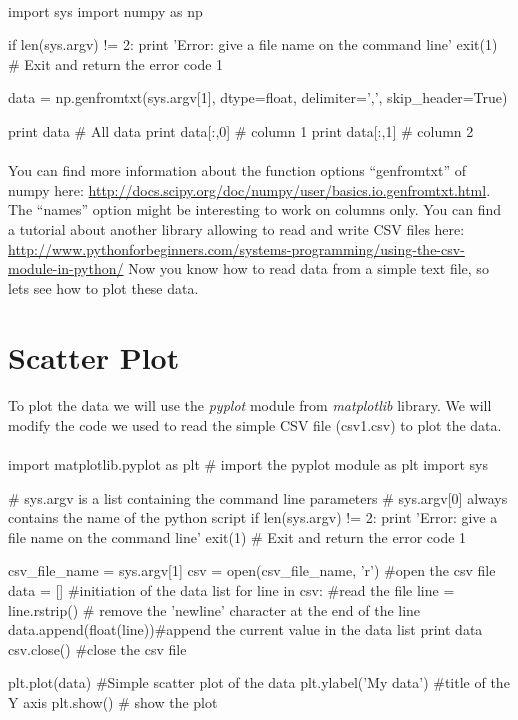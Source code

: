 \documentclass[article,10pt]{scrartcl}
\begin{document}
\paragraph{}

\begin{python}
import sys
import numpy as np

if len(sys.argv) != 2:
   print 'Error: give a file name on the command line'
   exit(1) # Exit and return the error code 1

data = np.genfromtxt(sys.argv[1], dtype=float, delimiter=',', skip_header=True) 

print data # All data
print data[:,0] # column 1
print data[:,1] # column 2

\end{python}
\paragraph{}
You can find more information about the function options ``genfromtxt'' of numpy here: \url{http://docs.scipy.org/doc/numpy/user/basics.io.genfromtxt.html}. The ``names'' option might be interesting to work on columns only. You can find a tutorial about another library allowing to read and write CSV files here: \url{http://www.pythonforbeginners.com/systems-programming/using-the-csv-module-in-python/}
Now you know how to read data from a simple text file, so lets see how to plot these data.

\section{Scatter Plot}
\paragraph{}
To plot the data we will use the \emph{pyplot} module from \emph{matplotlib} library. We will modify the code we used to read the simple CSV file (csv1.csv) to plot the data.
\paragraph{}
\begin{python}
import matplotlib.pyplot as plt # import the pyplot module as plt
import sys

# sys.argv is a list containing the command line parameters
# sys.argv[0] always contains the name of the python script
if len(sys.argv) != 2:
   print 'Error: give a file name on the command line'
   exit(1) # Exit and return the error code 1

csv_file_name = sys.argv[1]
csv = open(csv_file_name, 'r') #open the csv file
data = [] #initiation of the data list
for line in csv: #read the file
   line = line.rstrip() # remove the 'newline' character at the end of the line
   data.append(float(line))#append the current value in the data list
print data
csv.close() #close the csv file

plt.plot(data) #Simple scatter plot of the data
plt.ylabel('My data') #title of the Y axis
plt.show() # show the plot
\end{python}
\end{document}
